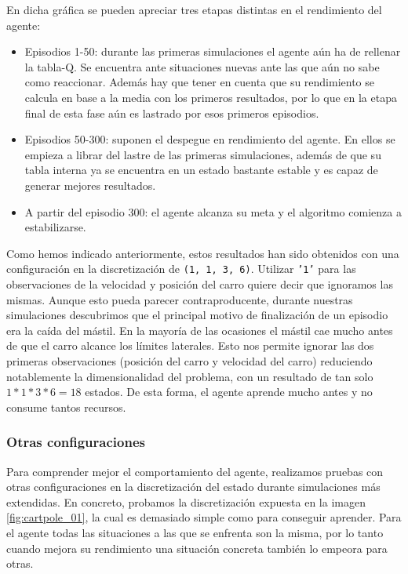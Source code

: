 En dicha gráfica se pueden apreciar tres etapas distintas en el rendimiento del agente:
\begin{itemize}
    \item Episodios 1-50: durante las primeras simulaciones el agente aún ha de rellenar la tabla-Q. Se encuentra ante situaciones nuevas ante las que aún no sabe como reaccionar. Además hay que tener en cuenta que su rendimiento se calcula en base a la media con los primeros resultados, por lo que en la etapa final de esta fase aún es lastrado por esos primeros episodios.
    \item Episodios 50-300: suponen el despegue en rendimiento del agente. En ellos se empieza a librar del lastre de las primeras simulaciones, además de que su tabla interna ya se encuentra en un estado bastante estable y es capaz de generar mejores resultados.
    \item A partir del episodio 300: el agente alcanza su meta y el algoritmo comienza a estabilizarse.
\end{itemize}

Como hemos indicado anteriormente, estos resultados han sido obtenidos con una configuración en la discretización de \texttt{(1, 1, 3, 6)}. Utilizar \texttt{'1'} para las observaciones de la velocidad y posición del carro quiere decir que ignoramos las mismas. Aunque esto pueda parecer contraproducente, durante nuestras simulaciones descubrimos que el principal motivo de finalización de un episodio era la caída del mástil. En la mayoría de las ocasiones el mástil cae mucho antes de que el carro alcance los límites laterales. Esto nos permite ignorar las dos primeras observaciones (posición del carro y velocidad del carro) reduciendo notablemente la dimensionalidad del problema, con un resultado de tan solo $1*1*3*6=18$ estados. De esta forma, el agente aprende mucho antes y no consume tantos recursos.

\subsubsection{Otras configuraciones}
Para comprender mejor el comportamiento del agente, realizamos pruebas con otras configuraciones en la discretización del estado durante simulaciones más extendidas. En concreto, probamos la discretización expuesta en la imagen \ref{fig:cartpole_01}, la cual es demasiado simple como para conseguir aprender. Para el agente todas las situaciones a las que se enfrenta son la misma, por lo tanto cuando mejora su rendimiento una situación concreta también lo empeora para otras.

